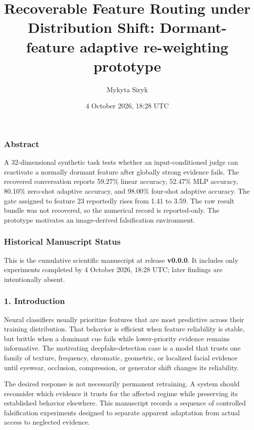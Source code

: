 \documentclass[
  10pt,
]{article}
\title{Recoverable Feature Routing under Distribution Shift:
Dormant-feature adaptive re-weighting prototype}
\author{Mykyta Siryk}
\date{4 October 2026, 18:28 UTC}
\begin{document}
\maketitle

\hypertarget{abstract}{%
\subsubsection{Abstract}\label{abstract}}

A 32-dimensional synthetic task tests whether an input-conditioned judge
can reactivate a normally dormant feature after globally strong evidence
fails. The recovered conversation reports 59.27\% linear accuracy,
52.47\% MLP accuracy, 80.10\% zero-shot adaptive accuracy, and 98.00\%
four-shot adaptive accuracy. The gate assigned to feature 23 reportedly
rises from 1.41 to 3.59. The raw result bundle was not recovered, so the
numerical record is reported-only. The prototype motivates an
image-derived falsification environment.

\hypertarget{historical-manuscript-status}{%
\subsubsection{Historical Manuscript
Status}\label{historical-manuscript-status}}

This is the cumulative scientific manuscript at release \textbf{v0.0.0}.
It includes only experiments completed by 4 October 2026, 18:28 UTC;
later findings are intentionally absent.

\hypertarget{introduction}{%
\subsubsection{1. Introduction}\label{introduction}}

Neural classifiers usually prioritize features that are most predictive
across their training distribution. That behavior is efficient when
feature reliability is stable, but brittle when a dominant cue fails
while lower-priority evidence remains informative. The motivating
deepfake-detection case is a model that trusts one family of texture,
frequency, chromatic, geometric, or localized facial evidence until
eyewear, occlusion, compression, or generator shift changes its
reliability.

The desired response is not necessarily permanent retraining. A system
should reconsider which evidence it trusts for the affected regime while
preserving its established behavior elsewhere. This manuscript records a
sequence of controlled falsification experiments designed to separate
apparent adaptation from actual access to neglected evidence.
\end{document}
